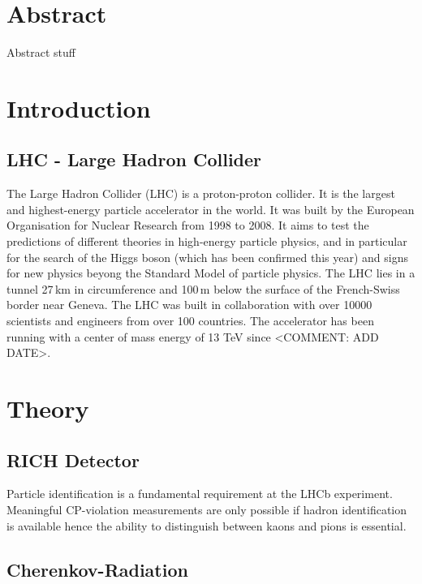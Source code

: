 \documentclass[10pt,twoside]{scrreprt}
\begin{document}
\chapter*{Abstract}
Abstract stuff
	

\chapter{Introduction}
\section{LHC - Large Hadron Collider} %
\label{sec:lhc_large_hadron_collider}

The Large Hadron Collider (LHC) is a proton-proton collider. It is the largest and highest-energy particle accelerator in the world. It was built by the European Organisation for Nuclear Research from 1998 to 2008. It aims to test the predictions of different theories in high-energy particle physics, and in particular for the search of the Higgs boson (which has been confirmed this year) and signs for new physics beyong the Standard Model of particle physics. The LHC lies in a tunnel 27\,km in circumference and 100\,m below the surface of the French-Swiss border near Geneva. The LHC was built in collaboration with over 10000 scientists and engineers from over 100 countries. The accelerator has been running with a center of mass energy of 13 TeV since <COMMENT: ADD DATE>.


\chapter{Theory}

\section{RICH Detector} %
\label{sec:rich_detector}

Particle identification is a fundamental requirement at the LHCb experiment. Meaningful CP-violation measurements are only possible if hadron identification is available hence the ability to distinguish between kaons and pions is  essential.

\section{Cherenkov-Radiation} %
\label{sec:cherenkov_radiation}
\end{document}
